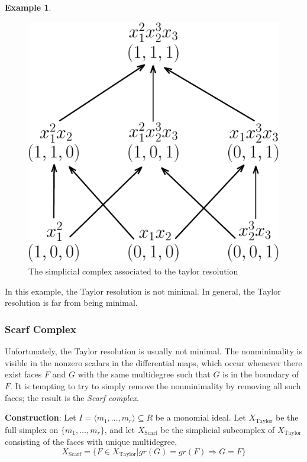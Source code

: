 \documentclass[paper=a4, fontsize=11pt]{scrartcl} %
\theoremstyle{plain}
\theoremstyle{definition}
\newtheorem{exmp}[thm]{Example}
\begin{document}
\begin{exmp}
\begin{figure}[!htb]
\centering
\includegraphics[scale=0.6]{./figures/example_taylor.pdf}
\caption{The simplicial complex associated to the taylor resolution}
\label{fig:taylor}
\end{figure}

In this example, the Taylor resolution is not minimal. In general, the Taylor resolution is far from being minimal.

\end{exmp}

\subsubsection{Scarf Complex}
Unfortunately, the Taylor resolution is usually not minimal. The nonminimality is visible in the nonzero scalars in the differential maps, which occur whenever there exist faces $F$ and $G$ with the same multidegree such that $G$ is in the boundary of $F$. It is tempting to try to simply remove the nonminimality by removing all such faces; the result is the \textit{Scarf complex}.

\textbf{Construction}: Let $I = \langle m_1, \dots, m_r \rangle \subseteq R$ be a monomial ideal. Let $X_{\text{Taylor}}$ be the full simplex on $\lbrace m_1, \dots, m_r \rbrace$, and let $X_{\text{Scarf}}$ be the simplicial subcomplex of $X_{\text{Taylor}}$ consisting of the faces with unique multidegree, $$X_{\text{Scarf}} = \lbrace F \in X_{\text{Taylor}} \vert gr(G) = gr(F) \Longrightarrow G = F \rbrace$$
\end{document}
